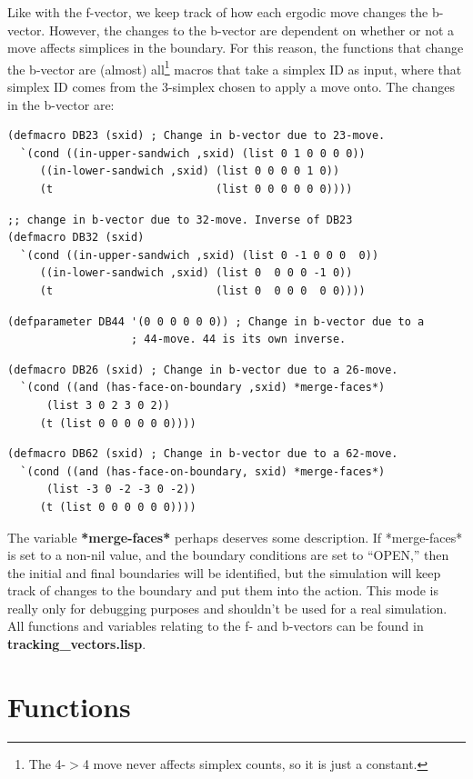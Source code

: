 \documentclass[12pt]{article}
\begin{document}
Like with the f-vector, we keep track of how each ergodic move changes
the b-vector. However, the changes to the b-vector are dependent on
whether or not a move affects simplices in the boundary. For this
reason, the functions that change the b-vector are (almost)
all\footnote{The 4-$>$4 move never affects simplex counts, so it is
  just a constant.} macros that take a simplex ID as input, where that
simplex ID comes from the 3-simplex chosen to apply a move onto. The changes in the b-vector are:
\begin{lstlisting}
(defmacro DB23 (sxid) ; Change in b-vector due to 23-move.
  `(cond ((in-upper-sandwich ,sxid) (list 0 1 0 0 0 0))
	 ((in-lower-sandwich ,sxid) (list 0 0 0 0 1 0))
	 (t                         (list 0 0 0 0 0 0))))
\end{lstlisting}
\begin{lstlisting}
;; change in b-vector due to 32-move. Inverse of DB23
(defmacro DB32 (sxid) 
  `(cond ((in-upper-sandwich ,sxid) (list 0 -1 0 0 0  0))
	 ((in-lower-sandwich ,sxid) (list 0  0 0 0 -1 0))
	 (t                         (list 0  0 0 0  0 0))))
\end{lstlisting}
\begin{lstlisting}
(defparameter DB44 '(0 0 0 0 0 0)) ; Change in b-vector due to a
				   ; 44-move. 44 is its own inverse.
\end{lstlisting}
\begin{lstlisting}
(defmacro DB26 (sxid) ; Change in b-vector due to a 26-move.
  `(cond ((and (has-face-on-boundary ,sxid) *merge-faces*)
	  (list 3 0 2 3 0 2))
	 (t (list 0 0 0 0 0 0))))
\end{lstlisting}
\begin{lstlisting}
(defmacro DB62 (sxid) ; Change in b-vector due to a 62-move.
  `(cond ((and (has-face-on-boundary, sxid) *merge-faces*)
	  (list -3 0 -2 -3 0 -2))
	 (t (list 0 0 0 0 0 0))))
\end{lstlisting}

The variable \textbf{*merge-faces*} perhaps deserves some
description. If *merge-faces* is set to a non-nil value, and the
boundary conditions are set to ``OPEN,'' then the initial and final
boundaries will be identified, but the simulation will keep track of
changes to the boundary and put them into the action. This mode is
really only for debugging purposes and shouldn't be used for a real
simulation. All functions and variables relating to the f- and
b-vectors can be found in \textbf{tracking\_vectors.lisp}.


\section{Functions}
\label{s:functions}
\end{document}
